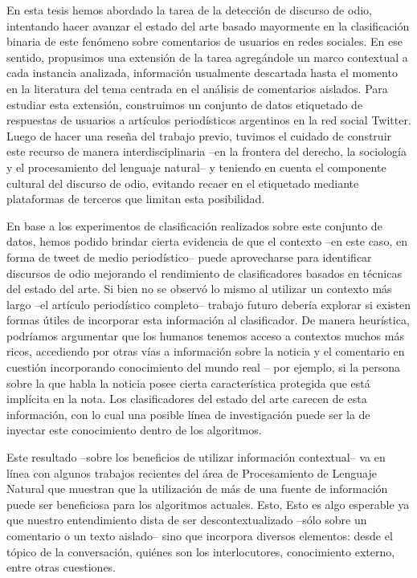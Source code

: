 En esta tesis hemos abordado la tarea de la detección de discurso de odio, intentando hacer avanzar el estado del arte basado mayormente en la clasificación binaria de este fenómeno sobre comentarios de usuarios en redes sociales. En ese sentido, propusimos una extensión de la tarea agregándole un marco contextual a cada instancia analizada, información usualmente descartada hasta el momento en la literatura del tema centrada en el análisis de comentarios aislados. Para estudiar esta extensión, construimos un conjunto de datos etiquetado de respuestas de usuarios a artículos periodísticos argentinos en la red social Twitter. Luego de hacer una reseña del trabajo previo, tuvimos el cuidado de construir este recurso de manera interdisciplinaria --en la frontera del derecho, la sociología y el procesamiento del lenguaje natural-- y teniendo en cuenta el componente cultural del discurso de odio, evitando recaer en el etiquetado mediante plataformas de terceros que limitan esta posibilidad.


En base a los experimentos de clasificación realizados sobre este conjunto de datos, hemos podido brindar cierta evidencia de que el contexto --en este caso, en forma de tweet de medio periodístico-- puede aprovecharse para identificar discursos de odio mejorando el rendimiento de clasificadores basados en técnicas del estado del arte. Si bien no se observó lo mismo al utilizar un contexto más largo --el artículo periodístico completo-- trabajo futuro debería explorar si existen formas útiles de incorporar esta información al clasificador. De manera heurística, podríamos argumentar que los humanos tenemos acceso a contextos muchos más ricos, accediendo por otras vías a información sobre la noticia y el comentario en cuestión incorporando conocimiento del mundo real -- por ejemplo, si la persona sobre la que habla la noticia posee cierta característica protegida que está implícita en la nota. Los clasificadores del estado del arte carecen de esta información, con lo cual una posible línea de investigación puede ser la de inyectar este conocimiento dentro de los algoritmos.

Este resultado --sobre los beneficios de utilizar información contextual-- va en línea con algunos trabajos recientes del área de Procesamiento de Lenguaje Natural que muestran que la utilización de más de una fuente de información puede ser beneficiosa para los algoritmos actuales. Esto,  Esto es algo esperable ya que nuestro entendimiento dista de ser descontextualizado --sólo sobre un comentario o un texto aislado-- sino que incorpora diversos elementos: desde el tópico de la conversación, quiénes son los interlocutores, conocimiento externo, entre otras cuestiones.

